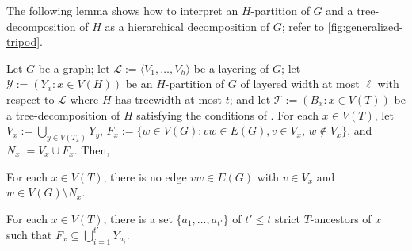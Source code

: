 \documentclass{patmorin}
\newcommand{\notex}[2]{}
\newcommand{\ylabel}[1]{\label{y:#1}}
\newcommand{\yref}[1]{(Y\ref{y:#1})}
\renewcommand{\le}{\leqslant}
\begin{document}


The following lemma shows how to interpret an $H$-partition of $G$ and a tree-decomposition of $H$ as a hierarchical decomposition of $G$; refer to \cref{fig:generalized-tripod}.
  
\begin{lem}\label{generalized-tripod}
  Let $G$ be a graph; let $\mathcal{L}:=\langle V_1,\ldots,V_h\rangle$ be a layering of $G$; let $\mathcal{Y}:=(Y_x: x\in V(H))$ be an $H$-partition of $G$ of layered width at most $\ell$ with respect to $\mathcal{L}$ where $H$ has treewidth at most $t$; and let $\mathcal{T}:=(B_x:x\in V(T))$ be a tree-decomposition of $H$ satisfying the conditions of .  For each $x\in V(T)$, let $V_x := \bigcup_{y\in V(T_x)} Y_y$, $F_x:=\{w\in V(G): vw\in E(G), v\in V_x,\, w\not\in V_x\}$, and $N_x:=V_x\cup F_x$.  Then, 
  \begin{compactenum}[(Y1)]
    \item\ylabel{separator} For each $x\in V(T)$, there is no edge $vw\in E(G)$ with $v\in V_x$ and $w\in V(G)\setminus N_x$. 
    \item\ylabel{ancestor-edge} For each $x\in V(T)$, there is a set $\{a_1,\ldots,a_{t'}\}$ of $t'\le t$ strict $T$-ancestors of $x$ such that $F_x \subseteq \bigcup_{i=1}^{t'} Y_{a_i}$.
  \end{compactenum}
\end{lem}
\end{document}
